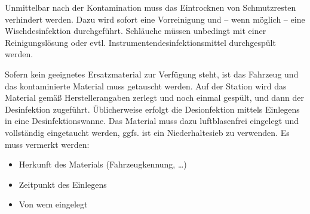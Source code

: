 {Unmittelbar nach der Kontamination muss das Eintrocknen von
Schmutzresten verhindert werden. Dazu wird sofort eine
Vorreinigung und -- wenn möglich -- eine Wischdesinfektion
durchgeführt. Schläuche müssen unbedingt mit einer
Reinigungslösung oder evtl. Instrumentendesinfektionsmittel
durchgespült werden.

Sofern kein geeignetes Ersatzmaterial zur Verfügung steht,
ist das Fahrzeug  und das
kontaminierte Material muss getauscht werden. Auf der
Station wird das Material gemäß Herstellerangaben zerlegt
und noch einmal gespült, und dann der Desinfektion
zugeführt. Üblicherweise erfolgt die Desionfektion mittels
Einlegens in eine Desinfektionswanne. Das Material muss dazu
luftblasenfrei eingelegt und vollständig eingetaucht werden,
ggfs. ist ein Niederhaltesieb zu verwenden. Es muss vermerkt
werden:

\begin{itemize}
  \item Herkunft des Materials (Fahrzeugkennung, \ldots)
  \item Zeitpunkt des Einlegens
  \item Von wem eingelegt
\end{itemize}

}

